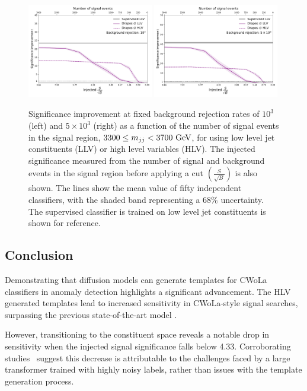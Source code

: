 \begin{figure}[hbpt]
    \centering
    \includegraphics[width=0.49\textwidth]{Figures/jet_generation/drapes/lowlevel_null_sic_vs_soverb_rej_1000.pdf}
    \includegraphics[width=0.49\textwidth]{Figures/jet_generation/drapes/lowlevel_null_sic_vs_soverb_rej_5000.pdf}
    \caption{Significance improvement at fixed background rejection rates of $10^3$ (left) and \mbox{$5 \times 10^3$} (right) as a function of the number of signal events in the signal region, \mbox{$3300\leq m_{jj}<3700~\GeV$}, for \drapes using low level jet constituents (LLV) or high level variables (HLV). The injected significance measured from the number of signal and background events in the signal region before applying a cut $(\frac{S}{\sqrt{B}})$ is also shown. The lines show the mean value of fifty independent classifiers, with the shaded band representing a 68\% uncertainty. The supervised classifier is trained on low level jet constituents is shown for reference.}
    \label{fig:drapes_llv}
\end{figure}

\subsection{Conclusion}

Demonstrating that diffusion models can generate templates for CWoLa classifiers in anomaly detection highlights a significant advancement.
The \drapes HLV generated templates lead to increased sensitivity in CWoLa-style signal searches, surpassing the previous state-of-the-art model \FfF.

However, transitioning to the constituent space reveals a notable drop in sensitivity when the injected signal significance falls below 4.33.
Corroborating studies~\cite{FullPhaseSpace} suggest this decrease is attributable to the challenges faced by a large transformer trained with highly noisy labels, rather than issues with the template generation process.
